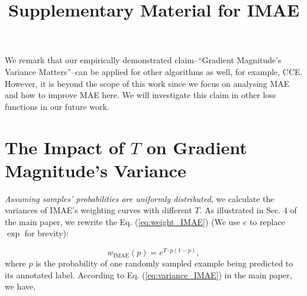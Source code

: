 \documentclass{article}
\begin{document}
We remark that our empirically demonstrated claim--``Gradient Magnitude's Variance Matters''--can be applied for other algorithms as well, for example, CCE.  
However, it is beyond the scope of this work since we focus on analysing MAE and how to improve MAE here. 
We will investigate this claim in other loss functions in our future work.   









{\small
	
	


	
}







\newpage
\title{ Supplementary Material for IMAE
	\vspace{-0.5cm}
}



\maketitle
\setcounter{page}{1}
\setcounter{equation}{16}
\setcounter{table}{3}
\setcounter{figure}{4}
\setcounter{section}{0}









\section{The Impact of $T$ on Gradient Magnitude's Variance}



\textit{Assuming samples' probabilities are uniformly distributed}, we calculate the variances of IMAE's weighting curves with different $T$. As illustrated in Sec. 4 of the main paper, we rewrite the Eq. (\ref{eq:weight_IMAE}) (We use $e$ to replace $\exp$ for brevity):


\begin{equation}
	w_{\mathrm{IMAE}} (p) =  e^{T  \cdot
p 
(1-p)},
\end{equation}
where $p$ is the probability of one randomly sampled example being predicted to its annotated label.  
According to Eq. (\ref{eq:variance_IMAE}) in the main paper, we have,
\end{document}

